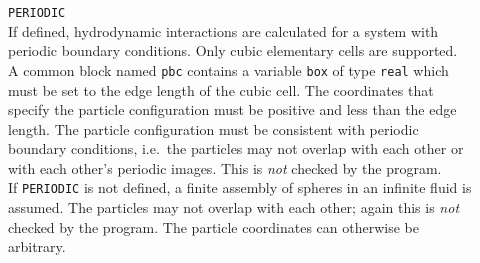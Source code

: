 \documentclass[12pt]{article}
\newcommand{\prog}[1]{{\tt #1}}
\begin{document}
\begin{description}

\item[]
\prog{PERIODIC}\\
If defined, hydrodynamic interactions are calculated for a
system with periodic boundary conditions. Only cubic elementary cells
are supported. A common block named \prog{pbc} contains a variable
\prog{box} of type \prog{real} which must be set to the edge length of
the cubic cell. The coordinates that specify the particle
configuration must be positive and less than the edge length. The
particle configuration must be consistent with periodic boundary
conditions, i.e.\ the particles may not overlap with each other or
with each other's periodic images. This is {\em not} checked by the
program.\\
If \prog{PERIODIC} is not defined, a finite assembly of
spheres in an infinite fluid is assumed. The particles may not overlap
with each other; again this is {\em not} checked by the program. The
particle coordinates can otherwise be arbitrary.


\end{description}
\end{document}
